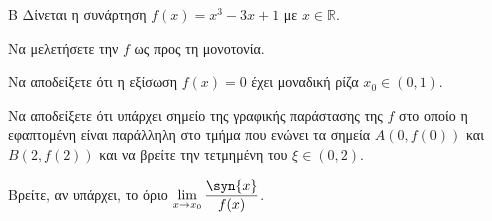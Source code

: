 \begin{thema}{Β}
Δίνεται η συνάρτηση $f(x) = x^3 - 3x + 1$ με $x \in \mathbb{R}$.
\begin{erwthma}
\item Να μελετήσετε την $f$ ως προς τη μονοτονία.
\item Να αποδείξετε ότι η εξίσωση $f(x)=0$ έχει μοναδική ρίζα $x_0 \in (0, 1)$.
\item Να αποδείξετε ότι υπάρχει σημείο της γραφικής παράστασης της $f$ στο οποίο η εφαπτομένη είναι παράλληλη στο τμήμα που ενώνει τα σημεία $A(0, f(0))$ και $B(2, f(2))$ και να βρείτε την τετμημένη του $\xi \in (0, 2)$.
\item Βρείτε, αν υπάρχει, το όριο $\lim\limits_{x\to x_0}{\dfrac{\syn{x}}{f(x)}}$.
\end{erwthma}
\end{thema}
